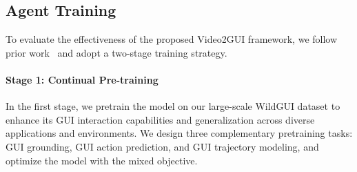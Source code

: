\documentclass{llmxive}
\begin{document}


\subsection{Agent Training}
\label{subsec: agent tuning}

To evaluate the effectiveness of the proposed Video2GUI framework, we follow prior work~\citep{xu2024aguvis, wang2025opencua} and adopt a two-stage training strategy.

\paragraph{Stage 1: Continual Pre-training}

In the first stage, we pretrain the model on our large-scale WildGUI dataset to enhance its GUI interaction capabilities and generalization across diverse applications and environments. We design three complementary pretraining tasks: GUI grounding, GUI action prediction, and GUI trajectory modeling, and optimize the model with the mixed objective.
\end{document}
